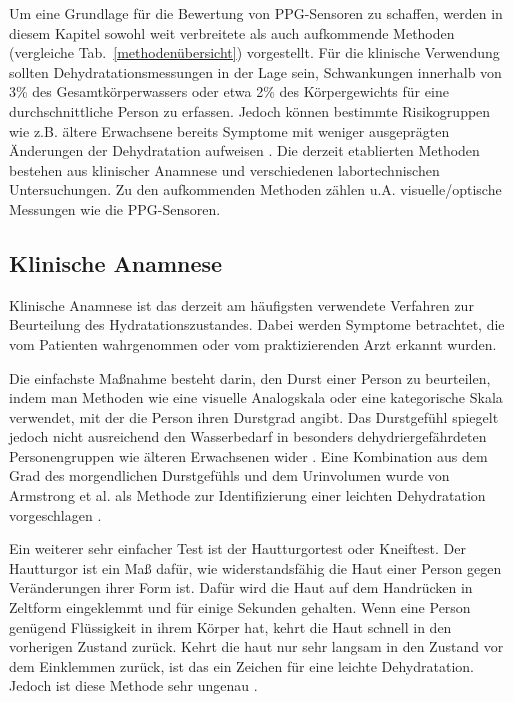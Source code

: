 \documentclass[10pt,a4paper,headinclude,twoside, plainheadsepline, open=right, numbers=noenddot, twocolumn]{article}
\begin{document}
Um eine Grundlage für die Bewertung von PPG-Sensoren zu schaffen, werden in diesem Kapitel sowohl weit verbreitete als auch aufkommende Methoden (vergleiche Tab.~\ref{methodenübersicht}) vorgestellt.
Für die klinische Verwendung sollten Dehydratationsmessungen in der Lage sein, Schwankungen innerhalb von 3\% des Gesamtkörperwassers oder etwa
2\% des Körpergewichts für eine durchschnittliche Person zu erfassen.
Jedoch können bestimmte Risikogruppen wie z.B. ältere Erwachsene bereits Symptome mit weniger ausgeprägten Änderungen der Dehydratation aufweisen \cite{garret2018engineering}.
Die derzeit etablierten Methoden bestehen aus klinischer Anamnese und verschiedenen labortechnischen Untersuchungen.
Zu den aufkommenden Methoden zählen u.A. visuelle/optische Messungen wie die PPG-Sensoren.

\subsection{Klinische Anamnese}
\label{klinische anamnese}

Klinische Anamnese ist das derzeit am häufigsten verwendete Verfahren zur Beurteilung des Hydratationszustandes.
Dabei werden Symptome betrachtet, die vom Patienten wahrgenommen oder vom praktizierenden Arzt erkannt wurden.
 
Die einfachste Maßnahme besteht darin, den Durst einer Person zu beurteilen, indem man Methoden wie eine visuelle Analogskala oder eine kategorische Skala verwendet, mit der die Person ihren Durstgrad angibt.
Das Durstgefühl spiegelt jedoch nicht ausreichend den Wasserbedarf in besonders dehydriergefährdeten Personengruppen wie älteren Erwachsenen wider \cite{garret2018engineering}.
Eine Kombination aus dem Grad des morgendlichen Durstgefühls und dem Urinvolumen wurde von Armstrong et al. als Methode zur Identifizierung einer leichten Dehydratation vorgeschlagen \cite{armstrong2013novel}.

Ein weiterer sehr einfacher Test ist der Hautturgortest oder Kneiftest. 
Der Hautturgor ist ein Maß dafür, wie widerstandsfähig die Haut einer Person gegen Veränderungen ihrer Form ist.
Dafür wird die Haut auf dem Handrücken in Zeltform eingeklemmt und für einige Sekunden gehalten.
Wenn eine Person genügend Flüssigkeit in ihrem Körper hat, kehrt die Haut schnell in den vorherigen Zustand zurück.
Kehrt die haut nur sehr langsam in den Zustand vor dem Einklemmen zurück, ist das ein Zeichen für eine leichte Dehydratation.
Jedoch ist diese Methode sehr ungenau \cite{suryadevara2015towards}.
\end{document}
